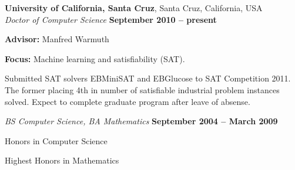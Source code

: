 \documentclass[margin,line]{resume}
\begin{document}
\begin{resume}
    \textbf{University of California, Santa Cruz}, Santa Cruz, California, USA \vspace{2mm}\\\vspace{1mm}%
    \textsl{Doctor of Computer Science} \hfill \textbf{ September 2010 -- present}\vspace{-3mm}\\\vspace{-1mm}%
    \begin{mylist}
        \item \textbf{Advisor:} Manfred Warmuth
        \item \textbf{Focus:} Machine learning and satisfiability (SAT).
        \item Submitted SAT solvers EBMiniSAT and EBGlucose to SAT Competition 2011.
            The former placing 4th in number of satisfiable industrial problem instances solved.
            Expect to complete graduate program after leave of absense.
    \end{mylist}\vspace{-1.5mm}
    \textsl{BS Computer Science, BA Mathematics} \hfill \textbf{September 2004 -- March 2009}\vspace{-3mm}\\\vspace{-1mm}%
    \begin{mylist}
        \item Honors in Computer Science
        \item Highest Honors in Mathematics
    \end{mylist}


%


\end{resume}
\end{document}
